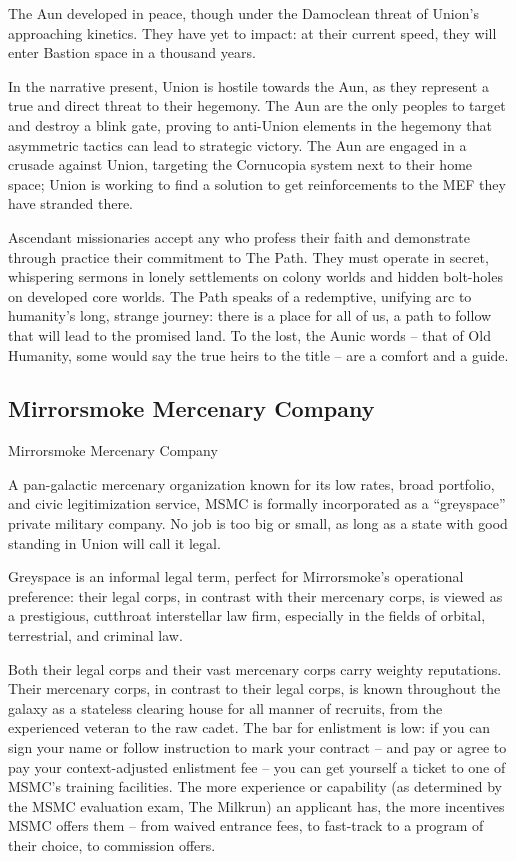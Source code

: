 The Aun developed in peace, though under the Damoclean threat of Union’s approaching
kinetics. They have yet to impact: at their current speed, they will enter Bastion space in a
thousand years.


In the narrative present, Union is hostile towards the Aun, as they represent a true and direct
threat to their hegemony. The Aun are the only peoples to target and destroy a blink gate,
proving to anti-Union elements in the hegemony that asymmetric tactics can lead to strategic
victory. The Aun are engaged in a crusade against Union, targeting the Cornucopia system next
to their home space; Union is working to find a solution to get reinforcements to the MEF they
have stranded there.


Ascendant missionaries accept any who profess their faith and demonstrate through practice
their commitment to The Path. They must operate in secret, whispering sermons in lonely
settlements on colony worlds and hidden bolt-holes on developed core worlds. The Path speaks
of a redemptive, unifying arc to humanity’s long, strange journey: there is a place for all of us, a
path to follow that will lead to the promised land. To the lost, the Aunic words -- that of Old
Humanity, some would say the true heirs to the title -- are a comfort and a guide.

\subsection{Mirrorsmoke Mercenary Company}
Mirrorsmoke Mercenary Company

A pan-galactic mercenary organization known for its low rates, broad portfolio, and civic
legitimization service, MSMC is formally incorporated as a “greyspace” private military company.
No job is too big or small, as long as a state with good standing in Union will call it legal.




Greyspace is an informal legal term, perfect for Mirrorsmoke’s operational preference: their legal
corps, in contrast with their mercenary corps, is viewed as a prestigious, cutthroat interstellar law
firm, especially in the fields of orbital, terrestrial, and criminal  law.


Both their legal corps and their vast mercenary corps carry weighty reputations. Their mercenary
corps, in contrast to their legal corps, is known throughout the galaxy as a stateless clearing
house for all manner of recruits, from the experienced veteran to the raw cadet. The bar for
enlistment is low: if you can sign your name or follow instruction to mark your contract -- and
pay or agree to pay your context-adjusted enlistment fee -- you can get yourself a ticket to one
of MSMC’s training facilities. The more experience or capability (as determined by the MSMC
evaluation exam, The Milkrun) an applicant has, the more incentives MSMC offers them -- from
waived entrance fees, to fast-track to a program of their choice, to commission offers.



